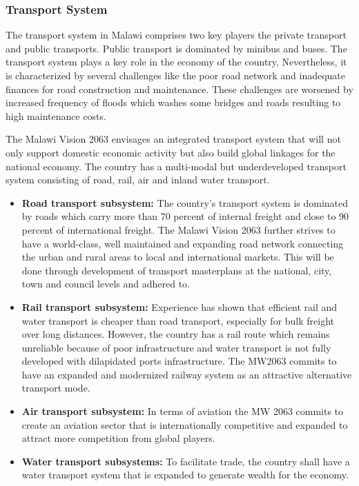 \documentclass[
]{book}
\begin{document}
\hypertarget{transport-system}{%
\subsubsection{Transport System}\label{transport-system}}

The transport system in Malawi comprises two key players the private transport and public transports. Public transport is dominated by minibus and buses. The
transport system plays a key role in the economy of the country, Nevertheless, it is characterized by several challenges like the poor road network and
inadequate finances for road construction and maintenance. These challenges are worsened by increased frequency of floods which washes some bridges and roads
resulting to high maintenance costs.

The Malawi Vision 2063 envisages an integrated transport system that will not only support domestic economic activity but also build global linkages for the
national economy. The country has a multi-modal but underdeveloped transport system consisting of road, rail, air and inland water transport.

\begin{itemize}
\item
  \textbf{Road transport subsystem:} The country's transport system is dominated by roads which carry more than 70 percent of internal freight and close to 90 percent of international freight. The Malawi Vision 2063 further strives to have a world-class, well maintained and expanding road network connecting the urban and rural areas to local and international markets. This will be done through development of transport masterplans at the national, city, town and council levels and adhered to.
\item
  \textbf{Rail transport subsystem:} Experience has shown that efficient rail and water transport is cheaper than road transport, especially for bulk freight over long distances. However, the country has a rail route which remains unreliable because of poor infrastructure and water transport is not fully developed with dilapidated ports infrastructure. The MW2063 commits to have an expanded and modernized railway system as an attractive alternative transport mode.
\item
  \textbf{Air transport subsystem:} In terms of aviation the MW 2063 commits to create an aviation sector that is internationally competitive and expanded to attract more competition from global players.
\item
  \textbf{Water transport subsystems:} To facilitate trade, the country shall have a water transport system that is expanded to generate wealth for the economy.
\end{itemize}
\end{document}
